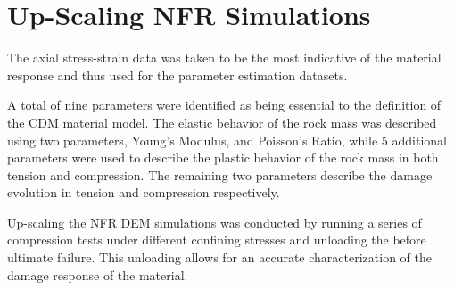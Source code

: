 \section{Up-Scaling NFR Simulations}

The axial stress-strain data was taken to be the most indicative of the material response and thus used for the parameter estimation datasets.


A total of nine parameters were identified as being essential to the definition of the CDM material model. The elastic behavior of the rock mass was described using two parameters, Young’s Modulus, and Poisson’s Ratio, while 5 additional parameters were used to describe the plastic behavior of the rock mass in both tension and compression. The remaining two parameters describe the damage evolution in tension and compression respectively.

Up-scaling the NFR DEM simulations was conducted by running a series of compression tests under different confining stresses and unloading the before ultimate failure. This unloading allows for an accurate characterization of the damage response of the material. 